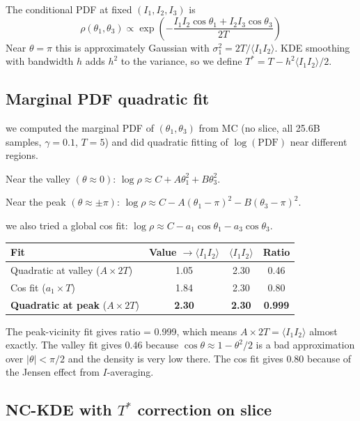 \documentclass[12pt]{article}
\begin{document}
The conditional PDF at fixed $(I_1, I_2, I_3)$ is
$$\rho(\theta_1,\theta_3) \propto \exp\!\left(-\frac{I_1 I_2 \cos\theta_1 + I_2 I_3 \cos\theta_3}{2T}\right)$$
Near $\theta = \pi$ this is approximately Gaussian with $\sigma_1^2 = 2T/\langle I_1 I_2\rangle$. KDE smoothing with bandwidth $h$ adds $h^2$ to the variance, so we define $T^* = T - h^2\langle I_1 I_2\rangle/2$.

\subsection*{Marginal PDF quadratic fit}

we computed the marginal PDF of $(\theta_1,\theta_3)$ from MC (no slice, all 25.6B samples, $\gamma=0.1$, $T=5$) and did quadratic fitting of $\log(\text{PDF})$ near different regions.

Near the valley $(\theta \approx 0)$: $\log\rho \approx C + A\theta_1^2 + B\theta_3^2$.

Near the peak $(\theta \approx \pm\pi)$: $\log\rho \approx C - A(\theta_1-\pi)^2 - B(\theta_3-\pi)^2$.

we also tried a global cos fit: $\log\rho \approx C - a_1\cos\theta_1 - a_3\cos\theta_3$.

\begin{center}
\begin{tabular}{lccc}
\toprule
Fit & Value $\to \langle I_1 I_2\rangle$ & $\langle I_1 I_2\rangle$ & Ratio \\
\midrule
Quadratic at valley ($A \times 2T$) & 1.05 & 2.30 & 0.46 \\
Cos fit ($a_1 \times T$) & 1.84 & 2.30 & 0.80 \\
\textbf{Quadratic at peak} ($A \times 2T$) & \textbf{2.30} & \textbf{2.30} & \textbf{0.999} \\
\bottomrule
\end{tabular}
\end{center}

The peak-vicinity fit gives ratio = 0.999, which means $A \times 2T = \langle I_1 I_2\rangle$ almost exactly. The valley fit gives 0.46 because $\cos\theta \approx 1 - \theta^2/2$ is a bad approximation over $|\theta| < \pi/2$ and the density is very low there. The cos fit gives 0.80 because of the Jensen effect from $I$-averaging.

\subsection*{NC-KDE with $T^*$ correction on slice}
\end{document}
